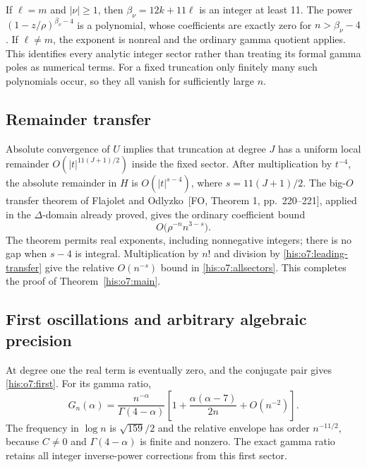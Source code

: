 \documentclass[11pt]{article}
\theoremstyle{remark}\newtheorem{remark}[theorem]{Remark}
\numberwithin{equation}{section}
\begin{document}
If $\ell=m$ and $|\nu|\ge1$, then
$\beta_\nu=12k+11\ell$ is an integer at least 11.
The power $(1-z/\rho)^{\beta_\nu-4}$ is a polynomial, whose
coefficients are exactly zero for $n>\beta_\nu-4$.
If $\ell\ne m$, the exponent is nonreal and the ordinary gamma
quotient applies. This identifies every analytic integer sector
rather than treating its formal gamma poles as numerical terms.
For a fixed truncation only finitely many such polynomials occur,
so they all vanish for sufficiently large $n$.

\subsection{Remainder transfer}
Absolute convergence of $U$ implies that truncation at degree $J$
has a uniform local remainder $O(|t|^{11(J+1)/2})$ inside the
fixed sector. After multiplication by $t^{-4}$, the absolute
remainder in $H$ is $O(|t|^{s-4})$, where $s=11(J+1)/2$.
The big-$O$ transfer theorem of Flajolet and
Odlyzko~[FO, Theorem 1, pp.~220--221], applied in the
$\Delta$-domain already proved, gives the ordinary coefficient bound
\[
O\bigl(\rho^{-n}n^{3-s}\bigr).
\]
The theorem permits real exponents, including nonnegative integers;
there is no gap when $s-4$ is integral.
Multiplication by $n!$ and division by \eqref{his:o7:leading-transfer}
give the relative $O(n^{-s})$ bound in \eqref{his:o7:allsectors}.
This completes the proof of Theorem~\ref{his:o7:main}.

\subsection{First oscillations and arbitrary algebraic precision}
At degree one the real term is eventually zero, and the conjugate
pair gives \eqref{his:o7:first}. For its gamma ratio,
\begin{equation}\label{his:o7:gamma-stirling}
G_n(\alpha)=\frac{n^{-\alpha}}{\Gamma(4-\alpha)}
\left[1+\frac{\alpha(\alpha-7)}{2n}+O(n^{-2})\right].
\end{equation}
The frequency in $\log n$ is $\sqrt{159}/2$ and the relative
envelope has order $n^{-11/2}$, because $C\ne0$ and
$\Gamma(4-\alpha)$ is finite and nonzero.
The exact gamma ratio retains all integer inverse-power corrections
from this first sector.
\end{document}
